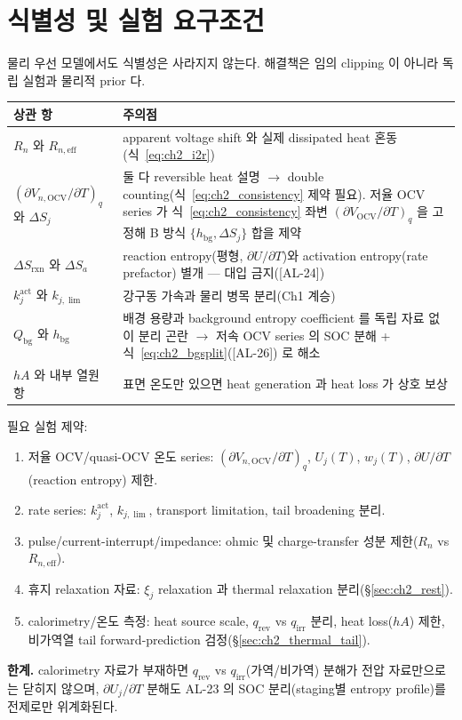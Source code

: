 \documentclass[11pt,a4paper]{article}
\newcommand{\eff}{\mathrm{eff}}
\newcommand{\bg}{\mathrm{bg}}
\newcommand{\OCV}{\mathrm{OCV}}
\newcommand{\irr}{\mathrm{irr}}
\newcommand{\rev}{\mathrm{rev}}
\newcommand{\rxn}{\mathrm{rxn}}
\newcommand{\AL}[1]{\textsf{[AL-#1]}}
\begin{document}
\section{식별성 및 실험 요구조건}\label{sec:ch2_ident}
물리 우선 모델에서도 식별성은 사라지지 않는다. 해결책은 임의 clipping 이 아니라 독립 실험과 물리적 prior 다.
\begin{longtable}{p{} p{}}
\toprule 상관 항 & 주의점 \\ \midrule \endhead
$R_n$ 와 $R_{n,\eff}$ & apparent voltage shift 와 실제 dissipated heat 혼동(식~\eqref{eq:ch2_i2r}) \\
$(\partial V_{n,\OCV}/\partial T)_q$ 와 $\Delta S_j$ & 둘 다 reversible heat 설명 $\to$ double counting(식~\eqref{eq:ch2_consistency} 제약 필요). 저율 OCV series 가 식~\eqref{eq:ch2_consistency} 좌변 $(\partial V_{\OCV}/\partial T)_q$ 을 고정해 B 방식 $\{h_\bg,\Delta S_j\}$ 합을 제약 \\
$\Delta S_{\rxn}$ 와 $\Delta S_a$ & reaction entropy(평형, $\partial U/\partial T$)와 activation entropy(rate prefactor) 별개 — 대입 금지(\AL{24}) \\
$k_j^{\mathrm{act}}$ 와 $k_{j,\lim}$ & 강구동 가속과 물리 병목 분리(Ch1 계승) \\
$Q_\bg$ 와 $h_\bg$ & 배경 용량과 background entropy coefficient 를 독립 자료 없이 분리 곤란 $\to$ 저속 OCV series 의 SOC 분해 + 식~\eqref{eq:ch2_bgsplit}(\AL{26}) 로 해소 \\
$hA$ 와 내부 열원 항 & 표면 온도만 있으면 heat generation 과 heat loss 가 상호 보상 \\
\bottomrule
\end{longtable}
필요 실험 제약:
\begin{enumerate}[label=\arabic*),leftmargin=2.0em]
\item 저율 OCV/quasi-OCV 온도 series: $(\partial V_{n,\OCV}/\partial T)_q$, $U_j(T)$, $w_j(T)$, $\partial U/\partial T$(reaction entropy) 제한.
\item rate series: $k_j^{\mathrm{act}}$, $k_{j,\lim}$, transport limitation, tail broadening 분리.
\item pulse/current-interrupt/impedance: ohmic 및 charge-transfer 성분 제한($R_n$ vs $R_{n,\eff}$).
\item 휴지 relaxation 자료: $\xi_j$ relaxation 과 thermal relaxation 분리(\S\ref{sec:ch2_rest}).
\item calorimetry/온도 측정: heat source scale, $q_\rev$ vs $q_\irr$ 분리, heat loss($hA$) 제한, 비가역열 tail forward-prediction 검정(\S\ref{sec:ch2_thermal_tail}).
\end{enumerate}
\textbf{한계.} calorimetry 자료가 부재하면 $q_\rev$ vs $q_\irr$(가역/비가역) 분해가 전압 자료만으로는 닫히지
않으며, $\partial U_j/\partial T$ 분해도 AL-23 의 SOC 분리(staging별 entropy profile)를 전제로만 위계화된다.
\end{document}
